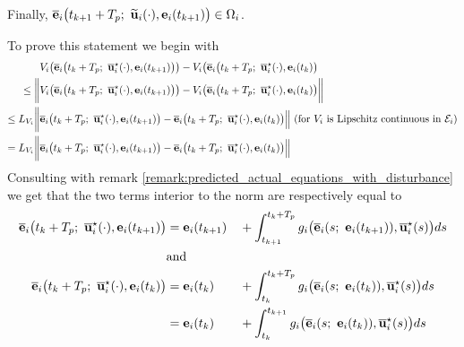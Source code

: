 Finally, $\overline{\bm{\mathbf{e}}}_i\big(t_{k+1} + T_p;\ \widetilde{\bm{\mathbf{u}}}_i(\cdot), \bm{\mathbf{e}}_i(t_{k+1}) \big) \in \Omega_i$.
\begin{gg_box}
To prove this statement we begin with
\begin{align}
  & V_i\big(\overline{\vect{e}}_i\big(t_k + T_p;\ \overline{\vect{u}}_i^{\star}(\cdot), \vect{e}_i(t_{k+1})\big)\big)
    - V_i\big(\overline{\vect{e}}_i\big(t_k + T_p;\ \overline{\vect{u}}_i^{\star}(\cdot), \vect{e}_i(t_k)\big) \\
  \leq \bigg\| & V_i\big(\overline{\vect{e}}_i\big(t_k + T_p;\ \overline{\vect{u}}_i^{\star}(\cdot), \vect{e}_i(t_{k+1})\big)\big)
    - V_i\big(\overline{\vect{e}}_i\big(t_k + T_p;\ \overline{\vect{u}}_i^{\star}(\cdot), \vect{e}_i(t_k)\big) \bigg \| \\
  \leq L_{V_i}\bigg \|& \overline{\vect{e}}_i\big(t_k + T_p;\ \overline{\vect{u}}_i^{\star}(\cdot), \vect{e}_i(t_{k+1})\big)
    - \overline{\vect{e}}_i\big(t_k + T_p;\ \overline{\vect{u}}_i^{\star}(\cdot), \vect{e}_i(t_k) \big)\Big\|
    \text{ (for } V_i \text{ is Lipschitz continuous in } \mathcal{E}_i \text{)} \\
  =  L_{V_i}\bigg \| & \overline{\vect{e}}_i\big(t_k + T_p;\ \overline{\vect{u}}_i^{\star}(\cdot), \vect{e}_i(t_{k+1})\big)
    - \overline{\vect{e}}_i\big(t_k + T_p;\ \overline{\vect{u}}_i^{\star}(\cdot), \vect{e}_i(t_k) \big)\Big\|
\label{eq:from_DV_to_De}
\end{align}
Consulting with remark \eqref{remark:predicted_actual_equations_with_disturbance}
we get that the two terms interior to the norm are respectively equal to
\begin{alignat}{2}
  \overline{\vect{e}}_i\big(t_k + T_p;\ \overline{\vect{u}}_i^{\star}(\cdot), \vect{e}_i(t_{k+1})\big)
    &= \vect{e}_i(t_{k+1}) &&+ \int_{t_{k+1}}^{t_k + T_p} g_i\big(\overline{\vect{e}}_i(s;\ \vect{e}_i(t_{k+1})), \overline{\vect{u}}_i^{\star}(s) \big)ds \\
    &\text{and}\\
  \overline{\vect{e}}_i\big(t_k + T_p;\ \overline{\vect{u}}_i^{\star}(\cdot), \vect{e}_i(t_k)\big)
    &= \vect{e}_i(t_k)     &&+ \int_{t_k}^{t_k + T_p} g_i\big(\overline{\vect{e}}_i(s;\ \vect{e}_i(t_k)), \overline{\vect{u}}_i^{\star}(s) \big)ds \\
    &= \vect{e}_i(t_k)     &&+ \int_{t_k}^{t_{k+1}} g_i\big(\overline{\vect{e}}_i(s;\ \vect{e}_i(t_k)), \overline{\vect{u}}_i^{\star}(s) \big)ds \\

\end{alignat}
\end{gg_box}
